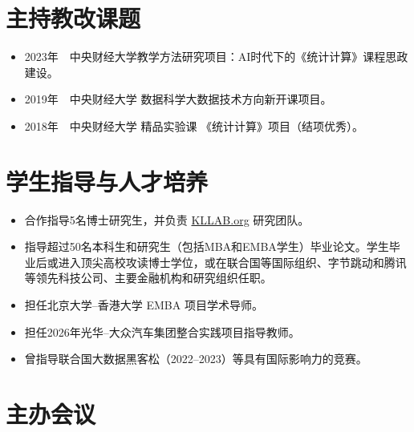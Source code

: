 \documentclass[twoside,a4paper,11pt]{article}
\begin{document}
\section{主持教改课题}

\begin{itemize}
\item 2023年~~中央财经大学教学方法研究项目：AI时代下的《统计计算》课程思政建设。
\item 2019年~~中央财经大学 数据科学大数据技术方向新开课项目。
\item 2018年~~中央财经大学 精品实验课 《统计计算》项目（结项优秀）。
\end{itemize}

\section{学生指导与人才培养}

\begin{itemize}

\item 合作指导5名博士研究生，并负责 \href{https://kllab.org}{KLLAB.org} 研究团队。
\item 指导超过50名本科生和研究生（包括MBA和EMBA学生）毕业论文。学生毕业后或进入顶尖高校攻读博士学位，或在联合国等国际组织、字节跳动和腾讯等领先科技公司、主要金融机构和研究组织任职。
\item 担任北京大学--香港大学 EMBA 项目学术导师。
\item 担任2026年光华--大众汽车集团整合实践项目指导教师。
\item 曾指导联合国大数据黑客松（2022--2023）等具有国际影响力的竞赛。

\end{itemize}

\section{主办会议}
\end{document}

